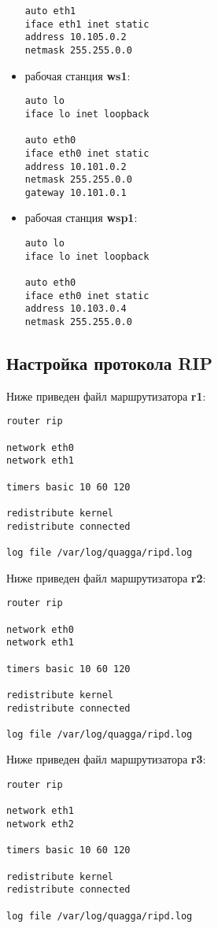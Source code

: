 \documentclass[a4paper,12pt]{article}
\begin{document}
\begin{itemize}
\begin{Verbatim}
auto eth1
iface eth1 inet static
address 10.105.0.2
netmask 255.255.0.0
\end{Verbatim}

\item рабочая станция \textbf{ws1}:
\begin{Verbatim}
auto lo
iface lo inet loopback

auto eth0
iface eth0 inet static
address 10.101.0.2
netmask 255.255.0.0
gateway 10.101.0.1
\end{Verbatim}

\item рабочая станция \textbf{wsp1}:
\begin{Verbatim}
auto lo
iface lo inet loopback

auto eth0
iface eth0 inet static
address 10.103.0.4
netmask 255.255.0.0
\end{Verbatim}

\end{itemize}

\subsection{Настройка протокола RIP}

Ниже приведен файл  маршрутизатора \textbf{r1}:

\begin{Verbatim}
router rip

network eth0
network eth1

timers basic 10 60 120

redistribute kernel
redistribute connected

log file /var/log/quagga/ripd.log
\end{Verbatim}

Ниже приведен файл  маршрутизатора \textbf{r2}:

\begin{Verbatim}
router rip

network eth0
network eth1

timers basic 10 60 120

redistribute kernel
redistribute connected

log file /var/log/quagga/ripd.log
\end{Verbatim}

Ниже приведен файл  маршрутизатора \textbf{r3}:

\begin{Verbatim}
router rip

network eth1
network eth2

timers basic 10 60 120

redistribute kernel
redistribute connected

log file /var/log/quagga/ripd.log
\end{Verbatim}
\end{document}
